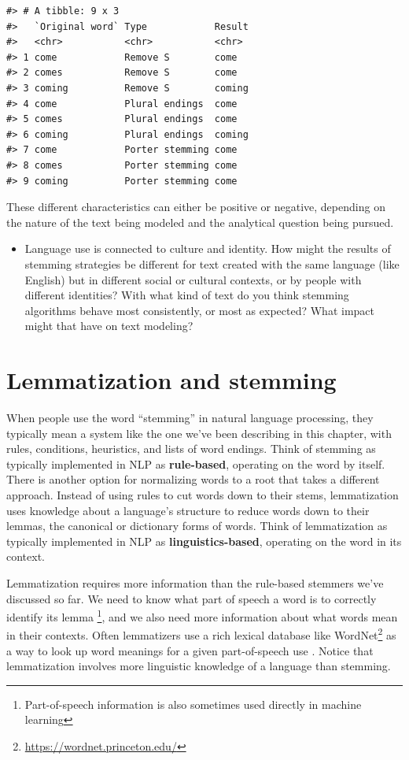 \documentclass[
]{krantz}
\DeclareRobustCommand{\href}[2]{#2\footnote{\url{#1}}}
\renewcommand{\href}[2]{#2\footnote{\url{#1}}}
\newenvironment{rmdblock}[1]
  {\begin{shaded*}
  \begin{itemize}[left = -1cm, labelsep = 1cm]
  \renewcommand{\labelitemi}{
    \raisebox{-.7\height}[0pt][0pt]{
      {\setkeys{Gin}{width=3em,keepaspectratio}\texttt{[image: images/\#1]}}
    }
  }
 
  \item
  }
  {
  \end{itemize}
  \end{shaded*}
  }
\newenvironment{rmdwarning}
  {\begin{rmdblock}{warning}}
  {\end{rmdblock}}
\begin{document}
\begin{verbatim}
#> # A tibble: 9 x 3
#>   `Original word` Type            Result
#>   <chr>           <chr>           <chr> 
#> 1 come            Remove S        come  
#> 2 comes           Remove S        come  
#> 3 coming          Remove S        coming
#> 4 come            Plural endings  come  
#> 5 comes           Plural endings  come  
#> 6 coming          Plural endings  coming
#> 7 come            Porter stemming come  
#> 8 comes           Porter stemming come  
#> 9 coming          Porter stemming come
\end{verbatim}

These different characteristics can either be positive or negative, depending on the nature of the text being modeled and the analytical question being pursued.

\begin{rmdwarning}
Language use is connected to culture and identity. How might the results
of stemming strategies be different for text created with the same
language (like English) but in different social or cultural contexts, or
by people with different identities? With what kind of text do you think
stemming algorithms behave most consistently, or most as expected? What
impact might that have on text modeling?
\end{rmdwarning}

\hypertarget{lemmatization}{%
\section{Lemmatization and stemming}\label{lemmatization}}

When people use the word ``stemming'' in natural language processing, they typically mean a system like the one we've been describing in this chapter, with rules, conditions, heuristics, and lists of word endings. Think of stemming as typically implemented in NLP as \textbf{rule-based}, operating on the word by itself. There is another option for normalizing words to a root that takes a different approach. Instead of using rules to cut words down to their stems, lemmatization uses knowledge about a language's structure to reduce words down to their lemmas, the canonical or dictionary forms of words. Think of lemmatization as typically implemented in NLP as \textbf{linguistics-based}, operating on the word in its context.

Lemmatization requires more information than the rule-based stemmers we've discussed so far. We need to know what part of speech a word is to correctly identify its lemma \footnote{Part-of-speech information is also sometimes used directly in machine learning}, and we also need more information about what words mean in their contexts. Often lemmatizers use a rich lexical database like \href{https://wordnet.princeton.edu/}{WordNet} as a way to look up word meanings for a given part-of-speech use \citep{Miller95}. Notice that lemmatization involves more linguistic knowledge of a language than stemming.
\end{document}

